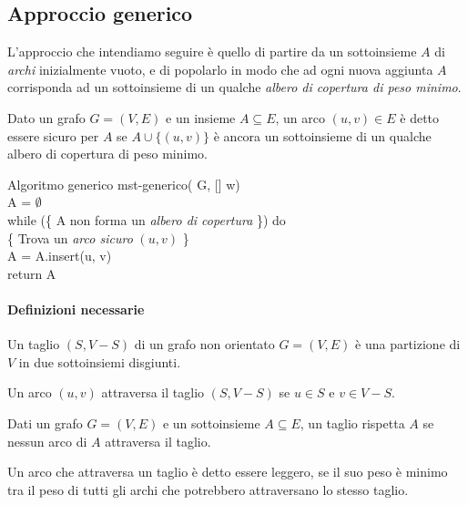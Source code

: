 \subsection{Approccio generico}
L'approccio che intendiamo seguire è quello di partire da un sottoinsieme $A$ di
\emph{archi} inizialmente vuoto, e di popolarlo in modo che ad ogni nuova
aggiunta $A$ corrisponda ad un sottoinsieme di un qualche \emph{albero di
copertura di peso minimo}.

\begin{definition}
    Dato un grafo $G=(V,E)$ e un insieme $A\subseteq E$, un arco $(u,v)\in E$ è
    detto essere sicuro per $A$ se $A\cup\{(u,v)\}$ è ancora un sottoinsieme di
    un qualche albero di copertura di peso minimo.
\end{definition}

\begin{minicode}{Algoritmo generico}
    \ind{} mst-generico( G, [] w)\\
         A = $\emptyset$\\
        \indf while (\{ A non forma un \emph{albero di copertura} \}) do\\
            \{ Trova un \emph{arco sicuro} $(u,v)$ \}\\
            A = A.insert(u, v)\\
        \indf return A
\end{minicode}

\paragraph{Definizioni necessarie}
\begin{definition}[Taglio]
    Un taglio $(S, V-S)$ di un grafo non orientato $G=(V,E)$ è una partizione di
    $V$ in due sottoinsiemi disgiunti.
\end{definition}
\begin{definition}
    Un arco $(u,v)$ attraversa il taglio $(S,V-S)$ se $u\in S$ e $v\in V-S$.
\end{definition}
\begin{definition}
    Dati un grafo $G=(V,E)$ e un sottoinsieme $A\subseteq E$, un taglio rispetta
    $A$ se nessun arco di $A$ attraversa il taglio.
\end{definition}
\begin{definition}
    Un arco che attraversa un taglio è detto essere leggero, se il suo peso è
    minimo tra il peso di tutti gli archi che potrebbero attraversano lo stesso
    taglio.
\end{definition}

